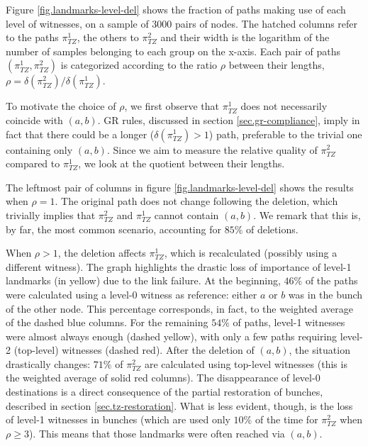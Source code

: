 \documentclass[a4paper,11pt,oneside]{report}
\begin{document}
\bigskip
Figure \ref{fig.landmarks-level-del} shows the fraction of paths making use of each level of witnesses, on a sample of 3000 pairs of nodes. The hatched columns refer to the paths $\pi_{TZ}^1$, the others to $\pi_{TZ}^2$ and their width is the logarithm of the number of samples belonging to each group on the x-axis. Each pair of paths $(\pi_{TZ}^1, \pi_{TZ}^2)$ is categorized according to the ratio $\rho$ between their lengths, $\rho = \delta(\pi_{TZ}^2) / \delta(\pi_{TZ}^1)$.

To motivate the choice of $\rho$, we first observe that $\pi_{TZ}^1$ does not necessarily coincide with $(a, b)$. GR rules, discussed in section \ref{sec.gr-compliance}, imply in fact that there could be a longer ($\delta(\pi_{TZ}^1)>1$) path, preferable to the trivial one containing only $(a, b)$. Since we aim to measure the relative quality of $\pi_{TZ}^2$ compared to $\pi_{TZ}^1$, we look at the quotient between their lengths.

\bigskip
The leftmost pair of columns in figure \ref{fig.landmarks-level-del} shows the results when $\rho=1$. The original path does not change following the deletion, which trivially implies that $\pi_{TZ}^2$ and $\pi_{TZ}^1$ cannot contain $(a,b)$. We remark that this is, by far, the most common scenario, accounting for $85\%$ of deletions.

\bigskip
When $\rho > 1$, the deletion affects $\pi_{TZ}^1$, which is recalculated (possibly using a different witness). The graph highlights the drastic loss of importance of level-1 landmarks (in yellow) due to the link failure.
At the beginning, $46\%$ of the paths were calculated using a level-0 witness as reference: either $a$ or $b$ was in the bunch of the other node. This percentage corresponds, in fact, to the weighted average of the dashed blue columns.
For the remaining $54\%$ of paths, level-1 witnesses were almost always enough (dashed yellow), with only a few paths requiring level-2 (top-level) witnesses (dashed red).
After the deletion of $(a, b)$, the situation drastically changes: $71\%$ of $\pi_{TZ}^2$ are calculated using top-level witnesses (this is the weighted average of solid red columns). The disappearance of level-0 destinations is a direct consequence of the partial restoration of bunches, described in section \ref{sec.tz-restoration}.
What is less evident, though, is the loss of level-1 witnesses in bunches (which are used only $10\%$ of the time for $\pi_{TZ}^2$ when $\rho \geq 3$). This means that those landmarks were often reached via $(a, b)$.
\end{document}
